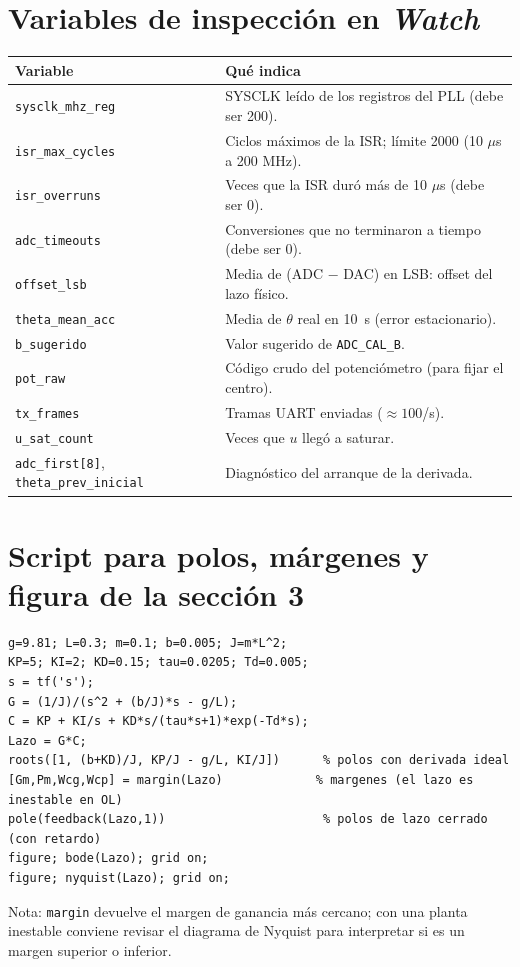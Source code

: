 \documentclass[11pt,a4paper]{article}
\begin{document}
\appendix
\section{Variables de inspecci\'on en \emph{Watch}}
\begin{table}[H]\centering\small
\begin{tabularx}{\linewidth}{@{}l X@{}}\toprule
Variable & Qu\'e indica \\ \midrule
\texttt{sysclk\_mhz\_reg} & SYSCLK le\'ido de los registros del PLL (debe ser 200). \\
\texttt{isr\_max\_cycles} & Ciclos m\'aximos de la ISR; l\'imite 2000 (10 $\mu$s a 200 MHz). \\
\texttt{isr\_overruns} & Veces que la ISR dur\'o m\'as de 10 $\mu$s (debe ser 0). \\
\texttt{adc\_timeouts} & Conversiones que no terminaron a tiempo (debe ser 0). \\
\texttt{offset\_lsb} & Media de (ADC $-$ DAC) en LSB: offset del lazo f\'isico. \\
\texttt{theta\_mean\_acc} & Media de $\theta$ real en 10~s (error estacionario). \\
\texttt{b\_sugerido} & Valor sugerido de \texttt{ADC\_CAL\_B}. \\
\texttt{pot\_raw} & C\'odigo crudo del potenci\'ometro (para fijar el centro). \\
\texttt{tx\_frames} & Tramas UART enviadas ($\approx100$/s). \\
\texttt{u\_sat\_count} & Veces que $u$ lleg\'o a saturar. \\
\texttt{adc\_first[8]}, \texttt{theta\_prev\_inicial} & Diagn\'ostico del arranque de la derivada. \\ \bottomrule
\end{tabularx}
\end{table}

\section{Script para polos, m\'argenes y figura de la secci\'on 3}
\begin{lstlisting}[language=matlabx,caption={C\'alculo de polos y m\'argenes (requiere Control System Toolbox para \texttt{margin}).}]
g=9.81; L=0.3; m=0.1; b=0.005; J=m*L^2;
KP=5; KI=2; KD=0.15; tau=0.0205; Td=0.005;
s = tf('s');
G = (1/J)/(s^2 + (b/J)*s - g/L);
C = KP + KI/s + KD*s/(tau*s+1)*exp(-Td*s);
Lazo = G*C;
roots([1, (b+KD)/J, KP/J - g/L, KI/J])      % polos con derivada ideal
[Gm,Pm,Wcg,Wcp] = margin(Lazo)             % margenes (el lazo es inestable en OL)
pole(feedback(Lazo,1))                      % polos de lazo cerrado (con retardo)
figure; bode(Lazo); grid on;
figure; nyquist(Lazo); grid on;
\end{lstlisting}
Nota: \texttt{margin} devuelve el margen de ganancia m\'as cercano; con una planta inestable conviene revisar el
diagrama de Nyquist para interpretar si es un margen superior o inferior.
\end{document}
